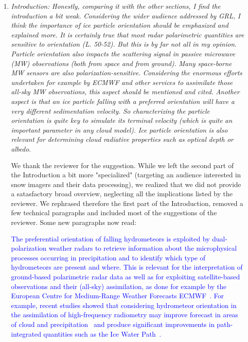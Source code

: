 \documentclass[12pt]{article}
\newcommand*{\blue}{\textcolor{blue}}
\begin{document}
\begin{enumerate}
    \item \textit{Introduction: Honestly, comparing it with the other sections, I find the introduction a bit weak. Considering the wider audience addressed by GRL, I think the importance of ice particle orientation should be emphasized and explained more. It is certainly true that most radar polarimetric quantities are sensitive to orientation (L. 50-52). But this is by far not all in my opinion. Particle orientation also impacts the scattering signal in passive microwave (MW) observations (both from space and from ground). Many space-borne MW sensors are also polarization-sensitive. Considering the enormous efforts undertaken for example by ECMWF and other services to assimilate those all-sky MW observations, this aspect should be mentioned and cited. Another aspect is that an ice particle falling with a preferred orientation will have a very different sedimentation velocity. So characterizing the particle orientation is quite key to simulate its terminal velocity (which is quite an important parameter in any cloud model). Ice particle orientation is also relevant for determining cloud radiative properties such as optical depth or albedo.}
    
    We thank the reviewer for the suggestion. While we left the second part of the Introduction a bit more "specialized" (targeting an audience interested in snow imagers and their data processing), we realized that we did not provide a satasfactory broad overview, neglecting all the implications listed by the reviewer. We rephrased therefore the first part of the Introduction, removed a few technical paragraphs and included most of the suggestions of the reviewer. Some new paragraphs now read:
    
    \blue{The preferential orientation of falling hydrometeors is exploited by dual-polarization weather radars to retrieve information about the microphysical processes occurring in precipitation and to identify which type of hydrometeors are present and where. This is relevant for the interpretation of ground-based polarimetric radar data as well as for exploiting satellite-based observations and their (all-sky) assimilation, as done for example by the European Centre for Medium-Range Weather Forecasts ECMWF~\cite{Eyre_QJRMS_2022}. For example, recent studies showed that considering hydrometeor orientation in the assimilation of high-frequency radiometry may improve forecast in areas of cloud and precipitation~\cite{Barlakas_AMT_2021} and produce significant improvements in path-integrated quantities such as the Ice Water Path~\cite{Kaur_RS_2022}. }


\end{enumerate}
\end{document}
